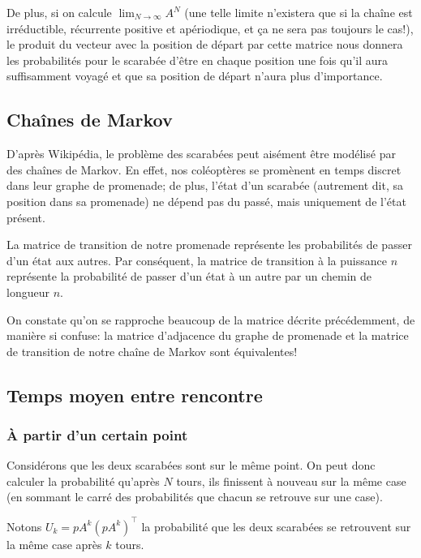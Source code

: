 \documentclass{scrartcl}
\begin{document}
  De plus, si on calcule $\lim_{N \to \infty} A^N$ (une telle limite n'existera
  que si la chaîne est irréductible, récurrente positive et apériodique, et ça
  ne sera pas toujours le cas!), le produit du vecteur avec la position de
  départ par cette matrice nous donnera les probabilités pour le scarabée
  d'être en chaque position une fois qu'il aura suffisamment voyagé et que sa
  position de départ n'aura plus d'importance.

  \subsection{Chaînes de Markov}
    D'après Wikipédia, le problème des scarabées peut aisément être modélisé
    par des chaînes de Markov. En effet, nos coléoptères se promènent en temps
    discret dans leur graphe de promenade; de plus, l'état d'un scarabée
    (autrement dit, sa position dans sa promenade) ne dépend pas du passé, mais
    uniquement de l'état présent.

    La matrice de transition de notre promenade représente les probabilités de
    passer d'un état aux autres. Par conséquent, la matrice de transition à la
    puissance $n$ représente la probabilité de passer d'un état à un autre par
    un chemin de longueur $n$.

    On constate qu'on se rapproche beaucoup de la matrice décrite précédemment,
    de manière si confuse: la matrice d'adjacence du graphe de promenade et la
    matrice de transition de notre chaîne de Markov sont équivalentes!

  \subsection{Temps moyen entre rencontre}
    \subsubsection{À partir d'un certain point}
      Considérons que les deux scarabées sont sur le même point.  On peut donc
      calculer la probabilité qu'après $N$ tours, ils finissent à nouveau sur
      la même case (en sommant le carré des probabilités que chacun se retrouve
      sur une case).

      Notons $U_k = pA^k(pA^k)^\intercal$ la probabilité que les deux scarabées
      se retrouvent sur la même case après $k$ tours.
\end{document}
